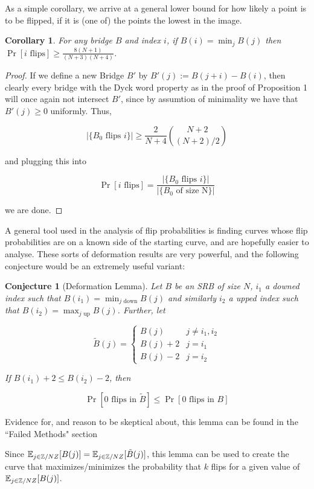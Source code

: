 \documentclass{article}
\newtheorem{corollary}{Corollary}
\newtheorem{conjecture}{Conjecture}
\theoremstyle{definition}
\begin{document}
As a simple corollary, we arrive at a general lower bound for how likely a point is to be flipped, if it is (one of) the points the lowest in the image.

\begin{corollary} For any bridge $B$ and index $i$, if $B(i)=\min_jB(j)$ then $\Pr[i \mathrm{\,\, flips}]\geq \frac{8(N+1)}{(N+3)(N+4)}$.
\end{corollary}
\begin{proof} If we define a new Bridge $B'$ by $B'(j):=B(j+i)-B(i)$, then clearly every bridge with the Dyck word property as in the proof of Proposition 1 will once again not intersect $B'$, since by assumtion of minimality we have that $B'(j)\geq0$ uniformly. Thus,

$$|\{B_0 \,\, \mathrm{flips\,\, }i\}|\geq \frac{2}{N+4}{N+2\choose (N+2)/2}$$

and plugging this into

$$\Pr[i\,\,\mathrm{flips}]=\frac{|\{B_0 \,\, \mathrm{flips\,\, }i\}|}{|\{B_0\,\,\mathrm{of\,\,size\,\,N}\}|}$$

we are done.
\end{proof}

A general tool used in the analysis of flip probabilities is finding curves whose flip probabilities are on a known side of the starting curve, and are hopefully easier to analyse. These sorts of deformation results are very powerful, and the following conjecture would be an extremely useful variant:

\begin{conjecture}[Deformation Lemma] Let $B$ be an SRB of size $N$, $i_1$ a downed index such that $B(i_1)=\min_{j\,\,\mathrm{down}}B(j)$ and similarly $i_2$ a upped index such that $B(i_2)=\max_{j\,\,\mathrm{up}}B(j)$. Further, let

$$\tilde{B}(j)=
\begin{cases}
B(j)& j\neq i_1,i_2\\
B(j)+2 & j=i_1\\
B(j)-2 & j=i_2
\end{cases}$$

If $B(i_1)+2\leq B(i_2)-2$, then

$$\Pr[0\mathrm{\,\,flips\,\,in\,\, }\tilde{B}]\leq \Pr[0\mathrm{\,\,flips\,\,in\,\, }B]$$
\end{conjecture}

Evidence for, and reason to be skeptical about, this lemma can be found in the ``Failed Methods" section

Since $\mathbb{E}_{j\in\mathbb{Z}/NZ}[B(j)]=\mathbb{E}_{j\in\mathbb{Z}/NZ}[\tilde{B}(j)]$, this lemma can be used to create the curve that maximizes/minimizes the probability that $k$ flips for a given value of $\mathbb{E}_{j\in\mathbb{Z}/NZ}[B(j)]$.
\end{document}
